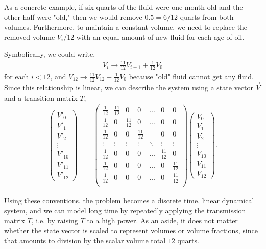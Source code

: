 \documentclass[reqno]{amsart}
\begin{document}
As a concrete example, if six quarts of the fluid were one month old and the other half were "old," then we would remove $0.5=6/12$ quarts from both volumes. Furthermore, to maintain a constant volume, we need to replace the removed volume $V_i/12$ with an equal amount of new fluid for each age of oil. 

Symbolically, we could write,
\begin{align*}
V_i \rightarrow \frac{11}{12} V_{i+1} + \frac{1}{12} V_0
\end{align*}
for each $i< 12$, and $V_{12} \rightarrow \frac{11}{12} V_{12} + \frac{1}{12} V_0$ because "old" fluid cannot get any fluid. Since this relationship is linear, we can describe the system using a state vector $\vec{V}$ and a transition matrix $T$,
\begin{align*}
\begin{pmatrix}
V'_0 \\ V'_1 \\ V'_2 \\ \vdots \\V'_{10}\\ V'_{11} \\ V'_{12}
\end{pmatrix} &= \begin{pmatrix}
\frac{1}{12} & \frac{11}{12} & 0 & 0 & \hdots & 0 & 0 \\
\frac{1}{12} & 0 & \frac{11}{12} & 0 & \hdots & 0 & 0 \\
\frac{1}{12} & 0 & 0 & \frac{11}{12} &  & 0 & 0 \\
\vdots & \vdots & \vdots & \vdots  & \ddots & \vdots & \vdots \\
\frac{1}{12} & 0 & 0 & 0 & \hdots & \frac{11}{12} & 0 \\
\frac{1}{12} & 0 & 0 & 0 & \hdots & 0 & \frac{11}{12} \\
\frac{1}{12} & 0 & 0 & 0 & \hdots & 0 & \frac{11}{12} \\
\end{pmatrix} \begin{pmatrix}
V_0 \\ V_1 \\ V_2 \\ \vdots \\V_{10} \\ V_{11} \\ V_{12}
\end{pmatrix}.
\end{align*}

Using these conventions, the problem becomes a discrete time, linear dynamical system, and we can model long time by repeatedly applying the transmission matrix $T$, i.e. by raising $T$ to a high power. As an aside, it does not matter whether the state vector is scaled to represent volumes or volume fractions, since that amounts to division by the scalar volume total $12$ quarts. 
\end{document}
